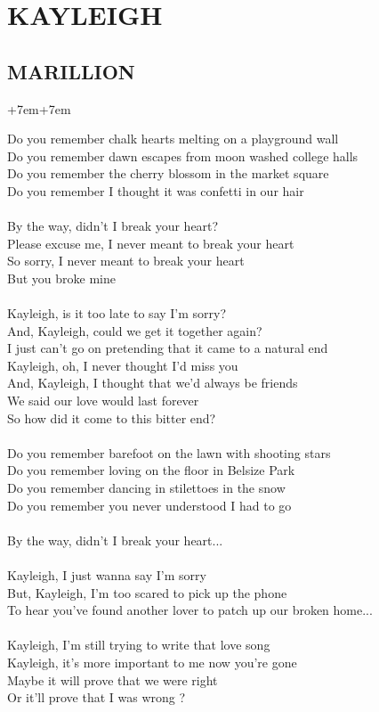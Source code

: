 \documentclass[a4paper]{report}
\newenvironment{song1}[2]{
	\section{\uppercase{#1}}
	\subsection{\uppercase{#2}}
	\begin{adjustwidth}{+7em}{+7em}
	\Large
	\index[autorzy]{{#2}!{#1}}
	\index[piosenki]{#1}
	}{
	\end{adjustwidth}
	\newpage
    }
\begin{document}
\begin{song1}{Kayleigh}{Marillion}
\noindent
Do you remember chalk hearts melting on a playground wall\\
Do you remember dawn escapes from moon washed college halls\\
Do you remember the cherry blossom in the market square\\
Do you remember I thought it was confetti in our hair\\
\\
By the way, didn't I break your heart?\\
Please excuse me, I never meant to break your heart\\
So sorry, I never meant to break your heart\\
But you broke mine\\
\\
Kayleigh, is it too late to say I'm sorry?\\
And, Kayleigh, could we get it together again?\\
I just can't go on pretending that it came to a natural end\\
Kayleigh, oh, I never thought I'd miss you\\
And, Kayleigh, I thought that we'd always be friends\\
We said our love would last forever\\
So how did it come to this bitter end?\\
\\
Do you remember barefoot on the lawn with shooting stars\\
Do you remember loving on the floor in Belsize Park\\
Do you remember dancing in stilettoes in the snow\\
Do you remember you never understood I had to go\\
\\
By the way, didn't I break your heart...\\
\\
Kayleigh, I just wanna say I'm sorry\\
But, Kayleigh, I'm too scared to pick up the phone\\
To hear you've found another lover to patch up our broken home...\\
\\
Kayleigh, I'm still trying to write that love song\\
Kayleigh, it's more important to me now you're gone\\
Maybe it will prove that we were right\\
Or it'll prove that I was wrong ?

\end{song1}
\end{document}
